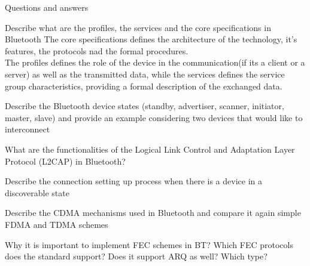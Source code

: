 \begin{section}{Questions and answers}
  \begin{subsubsection}{Describe what are the profiles, the services and the core specifications in
    Bluetooth}
    The core specifications defines the architecture of the technology, it's features, the protocols
    nad the formal procedures.\\
    The profiles defines the role of the device in the communication(if its a client or a server) as
    well as the transmitted data, while the services defines the service group characteristics,
    providing a formal description of the exchanged data. 
  \end{subsubsection}
  \begin{subsubsection}{Describe the Bluetooth device states (standby, advertiser, scanner,
      initiator, master, slave) and provide an example considering two devices that would like to
    interconnect}
  \end{subsubsection}
  \begin{subsubsection}{What are the functionalities of the Logical Link Control and Adaptation
    Layer Protocol (L2CAP) in Bluetooth?}
  \end{subsubsection}
  \begin{subsubsection}{Describe the connection setting up process when there is a device in a
    discoverable state}
  \end{subsubsection}
  \begin{subsubsection}{Describe the CDMA mechanisms used in Bluetooth and compare it again simple
    FDMA and TDMA schemes}
  \end{subsubsection}
  \begin{subsubsection}{Why it is important to implement FEC schemes in BT? Which FEC protocols does
    the standard support? Does it support ARQ as well? Which type?}
  \end{subsubsection}
\end{section}

